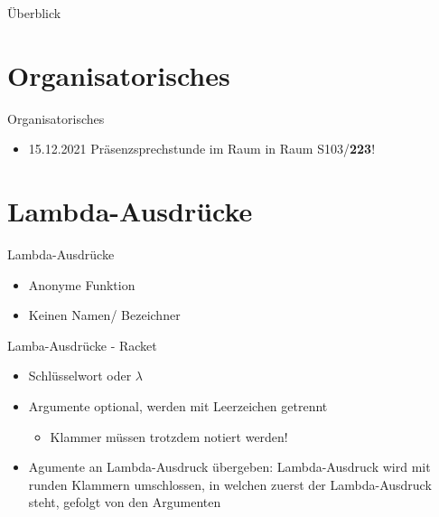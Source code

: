 \documentclass{../tuda-beamer}
\date{08. Dezember 2021}
\begin{document}
  \maketitle

  \begin{frame}{Überblick}
    \tableofcontents
  \end{frame}


  \section{Organisatorisches}
  \begin{frame}{Organisatorisches}
    \begin{itemize}
      \item 15.12.2021 Präsenzsprechstunde im Raum in Raum S103/\textbf{223}!
    \end{itemize}
  \end{frame}


  \section{Lambda-Ausdrücke}
  \begin{frame}{Lambda-Ausdrücke}
    \begin{itemize}
      \item Anonyme Funktion
      \item Keinen Namen/ Bezeichner
    \end{itemize}
  \end{frame}

  \begin{frame}{Lamba-Ausdrücke - Racket}
    \begin{itemize}
      \item Schlüsselwort  oder \textcolor{keywordcolor}{\(\lambda\)}
      \item Argumente optional, werden mit Leerzeichen getrennt
      \begin{itemize}
        \item Klammer müssen trotzdem notiert werden!
      \end{itemize}
      \item Agumente an Lambda-Ausdruck übergeben: Lambda-Ausdruck wird mit runden Klammern
      umschlossen, in welchen zuerst der Lambda-Ausdruck steht, gefolgt von den Argumenten
    \end{itemize}
    
  \end{frame}
\end{document}
